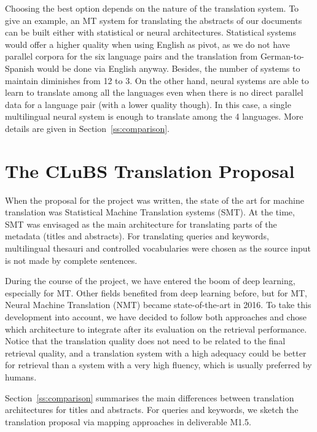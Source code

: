 \documentclass[a4paper,11pt]{article}
\begin{document}
Choosing the best option depends on the nature of the translation system. To give an example, an MT system for translating the abstracts of our documents can be built either with statistical or neural architectures. Statistical systems would offer a higher quality when using English as pivot, as we do not have parallel corpora for the six language pairs and the translation from German-to-Spanish would be done via English anyway. Besides, the number of systems to maintain diminishes from 12 to 3.
On the other hand, neural systems are able to learn to translate among all the languages even when there is no direct parallel data for a language pair (with a lower quality though). In this case, a single multilingual neural system is enough to translate among the 4 languages. More details are given in Section~\ref{ss:comparison}.



\section{The CLuBS Translation Proposal}
\label{s:proposal}

When the proposal for the project was written, the state of the art for machine translation was Statistical Machine Translation systems (SMT). At the time, SMT was envisaged as the main architecture for translating parts of the metadata (titles and abstracts). For translating queries and keywords, multilingual thesauri and controlled vocabularies were chosen as the source input is not made by complete sentences.

During the course of the project, we have entered the boom of deep learning, especially for MT. Other fields benefited from deep learning before, but for MT, Neural Machine Translation (NMT) became state-of-the-art in 2016. To take this development into account, we have decided to follow both approaches and chose which architecture to integrate after its evaluation on the retrieval performance. Notice that the translation quality does not need to be related to the final retrieval quality, and a translation system with a high adequacy could be better for retrieval than a system with a very high fluency, which is usually preferred by humans.

Section~\ref{ss:comparison} summarises the main differences between translation architectures for titles and abstracts. For queries and keywords, we sketch the translation proposal  via mapping approaches in deliverable M1.5.
\end{document}
